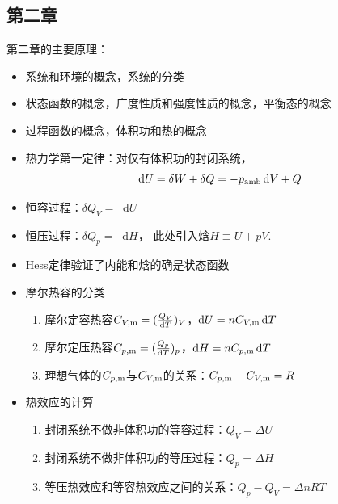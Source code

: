 \documentclass[9pt]{beamer}
\newcommand\amb{{\rm amb}}
\newcommand*{\dif}{\mathop{}\!\mathrm{d}}
\newcommand\m{{\rm m}}
\begin{document}
	\subsection{第二章}
	\begin{frame}
	
	第二章的主要原理：
	
	\begin{itemize}
	
	\item 系统和环境的概念，系统的分类
	
	\item 状态函数的概念，广度性质和强度性质的概念，平衡态的概念
	
	\item 过程函数的概念，体积功和热的概念
	
	\item 热力学第一定律：对仅有体积功的封闭系统，
	\[
		\dif U = \delta W + \delta Q = -p_{\amb} \dif V + Q 
	\]
	
	\item 恒容过程：$\delta Q_V = \dif U$
	
	\item 恒压过程：$\delta Q_p = \dif H$， 此处引入焓$H\equiv U+pV$.
	
	\item Hess定律验证了内能和焓的确是状态函数
	
	\item 摩尔热容的分类
	
		\begin{enumerate}
	
		\item 摩尔定容热容$C_{V,\m}=(\frac{Q_V}{\dif T})_V$，$\dif U = n C_{V,\m} \dif T$
		
		\item 摩尔定压热容$C_{p,\m}=(\frac{Q_p}{\dif T})_p$，$\dif H = n C_{p,\m} \dif T$
		
		\item 理想气体的$C_{p,\m}$与$C_{V,\m}$的关系：$C_{p,\m}-C_{V,\m}=R$
	
		\end{enumerate}
	
	\item 热效应的计算
		\begin{enumerate}
	
		\item 封闭系统不做非体积功的等容过程：$Q_V=\Delta U$
		
		\item 封闭系统不做非体积功的等压过程：$Q_p=\Delta H$
		
		\item 等压热效应和等容热效应之间的关系：$Q_p-Q_V = \Delta n RT$
	
		\end{enumerate}
	
	\end{itemize}
	
	\end{frame}
\end{document}
